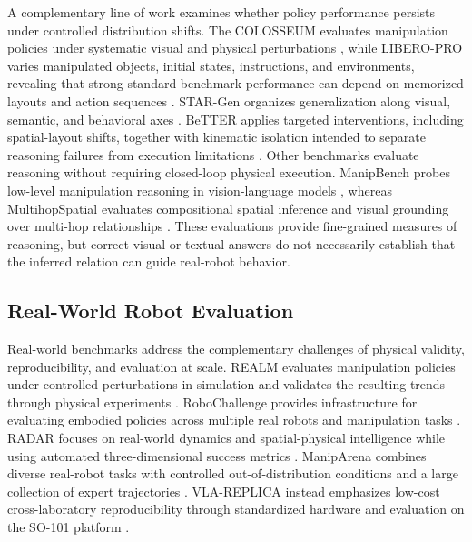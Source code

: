 \documentclass[conference]{IEEEtran}
\begin{document}
A complementary line of work examines whether policy performance persists under controlled distribution shifts. The COLOSSEUM evaluates manipulation policies under systematic visual and physical perturbations \cite{pumacay2024colosseum}, while LIBERO-PRO varies manipulated objects, initial states, instructions, and environments, revealing that strong standard-benchmark performance can depend on memorized layouts and action sequences \cite{zhou2025liberopro}. STAR-Gen organizes generalization along visual, semantic, and behavioral axes \cite{gao2026stargen}. BeTTER applies targeted interventions, including spatial-layout shifts, together with kinematic isolation intended to separate reasoning failures from execution limitations \cite{xu2026better}. Other benchmarks evaluate reasoning without requiring closed-loop physical execution. ManipBench probes low-level manipulation reasoning in vision-language models \cite{zhao2025manipbench}, whereas MultihopSpatial evaluates compositional spatial inference and visual grounding over multi-hop relationships \cite{lee2026multihopspatial}. These evaluations provide fine-grained measures of reasoning, but correct visual or textual answers do not necessarily establish that the inferred relation can guide real-robot behavior.

\subsection{Real-World Robot Evaluation}

Real-world benchmarks address the complementary challenges of physical validity, reproducibility, and evaluation at scale. REALM evaluates manipulation policies under controlled perturbations in simulation and validates the resulting trends through physical experiments \cite{sedlacek2025realm}. RoboChallenge provides infrastructure for evaluating embodied policies across multiple real robots and manipulation tasks \cite{yakefu2025robochallenge}. RADAR focuses on real-world dynamics and spatial-physical intelligence while using automated three-dimensional success metrics \cite{chen2026radar}. ManipArena combines diverse real-robot tasks with controlled out-of-distribution conditions and a large collection of expert trajectories \cite{sun2026maniparena}. VLA-REPLICA instead emphasizes low-cost cross-laboratory reproducibility through standardized hardware and evaluation on the SO-101 platform \cite{huang2026vlareplica}.
\end{document}
